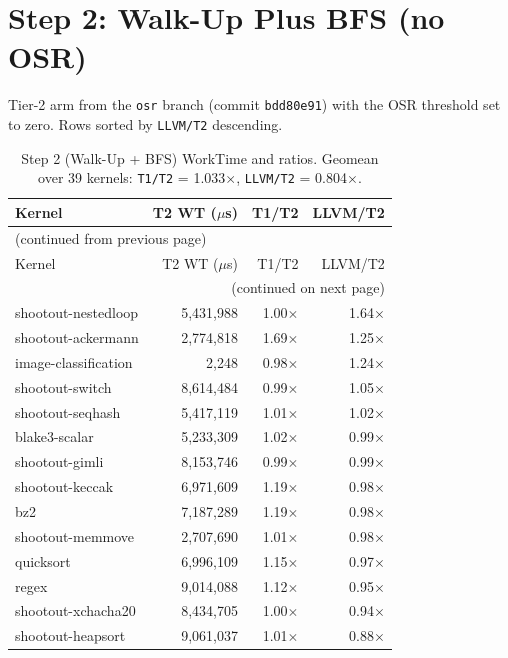 \section{Step 2: Walk-Up Plus BFS (no OSR)}
\label{sec:appB:step2}

Tier-2 arm from the \texttt{osr} branch (commit \texttt{bdd80e91}) with the OSR threshold set to zero. Rows sorted by \texttt{LLVM/T2} descending.

\begin{longtable}{l r r r}
\caption{Step 2 (Walk-Up + BFS) WorkTime and ratios. Geomean over 39 kernels: \texttt{T1/T2} = 1.033$\times$, \texttt{LLVM/T2} = 0.804$\times$.}
\label{tbl:appB:step2:wt}\\
\toprule
Kernel & T2 WT ($\mu$s) & T1/T2 & LLVM/T2 \\
\midrule
\endfirsthead
\multicolumn{4}{l}{\small (continued from previous page)} \\
\toprule
Kernel & T2 WT ($\mu$s) & T1/T2 & LLVM/T2 \\
\midrule
\endhead
\midrule
\multicolumn{4}{r}{\small (continued on next page)} \\
\endfoot
\bottomrule
\endlastfoot
shootout-nestedloop & 5{,}431{,}988 & 1.00$\times$ & 1.64$\times$ \\
shootout-ackermann & 2{,}774{,}818 & 1.69$\times$ & 1.25$\times$ \\
image-classification & 2{,}248 & 0.98$\times$ & 1.24$\times$ \\
shootout-switch & 8{,}614{,}484 & 0.99$\times$ & 1.05$\times$ \\
shootout-seqhash & 5{,}417{,}119 & 1.01$\times$ & 1.02$\times$ \\
blake3-scalar & 5{,}233{,}309 & 1.02$\times$ & 0.99$\times$ \\
shootout-gimli & 8{,}153{,}746 & 0.99$\times$ & 0.99$\times$ \\
shootout-keccak & 6{,}971{,}609 & 1.19$\times$ & 0.98$\times$ \\
bz2 & 7{,}187{,}289 & 1.19$\times$ & 0.98$\times$ \\
shootout-memmove & 2{,}707{,}690 & 1.01$\times$ & 0.98$\times$ \\
quicksort & 6{,}996{,}109 & 1.15$\times$ & 0.97$\times$ \\
regex & 9{,}014{,}088 & 1.12$\times$ & 0.95$\times$ \\
shootout-xchacha20 & 8{,}434{,}705 & 1.00$\times$ & 0.94$\times$ \\
shootout-heapsort & 9{,}061{,}037 & 1.01$\times$ & 0.88$\times$ \\

\end{longtable}
